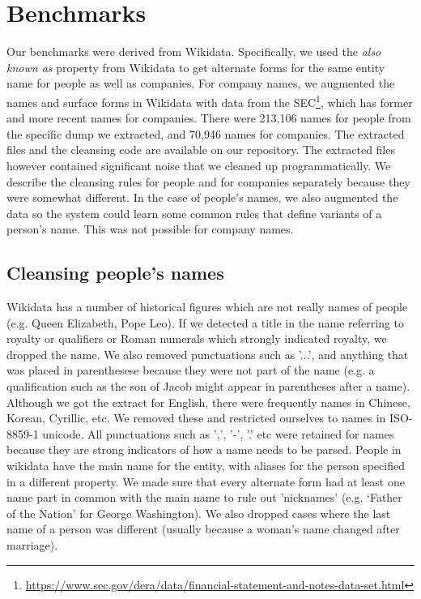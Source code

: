 \section{Benchmarks}
\label{datasets}
Our benchmarks were derived from Wikidata.  Specifically, we used the \textit{also known as} property from Wikidata to get alternate forms for the same entity name for people as well as companies.  For company names, we augmented the names and surface forms in Wikidata with data from the SEC\footnote{\url{https://www.sec.gov/dera/data/financial-statement-and-notes-data-set.html}}, which has former and more recent names for companies.  There were 213,106 names for people from the specific dump we extracted, and 70,946 names for companies.  The extracted files and the cleansing code are available on our repository. The extracted files however contained significant noise that we cleaned up programmatically.  We describe the cleansing rules for people and for companies separately because they were somewhat different.  In the case of people's names, we also augmented the data so the system could learn some common rules that define variants of a person's name.  This was not possible for company names.

\subsection{Cleansing people's names}
Wikidata has a number of historical figures which are not really names of people (e.g. Queen Elizabeth, Pope Leo).  If we detected a title in the name referring to royalty or qualifiers or Roman numerals which strongly indicated royalty, we dropped the name.  We also removed punctuations such as '...', and anything that was placed in parenthesese because they were not part of the name (e.g. a qualification such as the son of Jacob might appear in parentheses after a name).  Although we got the extract for English, there were frequently names in Chinese, Korean, Cyrillic, etc.  We removed these and restricted ourselves to names in ISO-8859-1 unicode.  All punctuations such as ',', '-', '.' etc were retained for names because they are strong indicators of how a name needs to be parsed.  People in wikidata have the main name for the entity, with aliases for the person specified in a different property.  We made sure that every alternate form had at least one name part in common with the main name to rule out 'nicknames' (e.g. `Father of the Nation' for George Washington).  We also dropped cases where the last name of a person was different (usually because a woman's name changed after marriage).      

